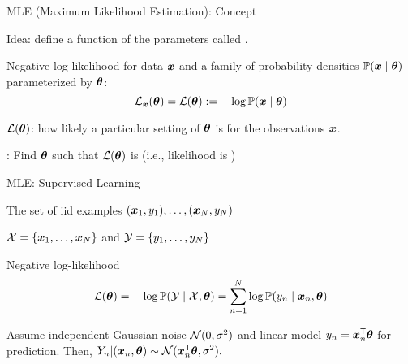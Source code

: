 \documentclass[handout,fleqn,aspectratio=169]{beamer}
\begin{document}
\begin{frame}{MLE (Maximum Likelihood Estimation): Concept}

\plitemsep 0.07in

\bci 

\item Idea: define a function of the parameters called .

\item Negative log-likelihood for data $\bm{x}$ and a family of probability densities $\mathbb{P}( \bm{x} \mid \bm{\theta} )$ parameterized by $\bm{\theta}$:
$$
{\cal L}_{\bm{x}}(\bm{\theta}) = {\cal L}(\bm{\theta}) := - \log \mathbb{P}( \bm{x} \mid \bm{\theta} )
$$
\bci
\item ${\cal L}(\bm{\theta})$: how likely a particular setting of $\bm{\theta}$ is for the observations $\bm{x}$.
\eci

\bigskip
\item {}: Find $\bm{\theta}$ such that ${\cal L}(\bm{\theta})$ is  (i.e., likelihood is )
\eci
\end{frame}

\begin{frame}{MLE: Supervised Learning}

\plitemsep 0.05in

\bci 

\item The set of iid examples $(\bm{x}_1, y_1), \ldots, (\bm{x}_N,y_N)$

\item $\mathcal X = \{\bm{x}_1, \ldots, \bm{x}_N \}$ and $\mathcal Y = \{y_1, \ldots, y_N \}$

\item Negative log-likelihood
$$
{\cal L}(\bm{\theta}) = - \log \mathbb{P}( \mathcal Y \mid \mathcal X, \bm{\theta} ) = \sum_{n=1}^N \log \mathbb{P}( y_n \mid \bm{x}_n, \bm{\theta} )
$$

\item \exam Assume independent Gaussian noise $\mathcal N(0,\sigma^2)$ and linear model $y_n = {\bm{x}}^{\mathsf{T}}_n \bm{\theta}$ for prediction. Then, $Y_n| (\bm{x}_n,\bm{\theta}) \sim \mathcal N({\bm{x}}^{\mathsf{T}}_n\bm{\theta}, \sigma^2).$
{\small
{}}

\eci
\end{frame}
\end{document}
